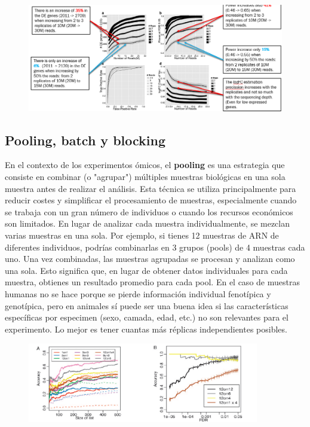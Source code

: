 \begin{figure}[h]
\centering
\includegraphics[width = \textwidth]{figs/replicates-depth.png}
\end{figure}

\subsection{Pooling, batch y blocking}
En el contexto de los experimentos ómicos, el \textbf{pooling} es una estrategia que consiste en combinar (o "agrupar") múltiples muestras biológicas en una sola muestra antes de realizar el análisis. Esta técnica se utiliza principalmente para reducir costes y simplificar el procesamiento de muestras, especialmente cuando se trabaja con un gran número de individuos o cuando los recursos económicos son limitados. En lugar de analizar cada muestra individualmente, se mezclan varias muestras en una sola. Por ejemplo, si tienes 12 muestras de ARN de diferentes individuos, podrías combinarlas en 3 grupos (pools) de 4 muestras cada uno. Una vez combinadas, las muestras agrupadas se procesan y analizan como una sola. Esto significa que, en lugar de obtener datos individuales para cada muestra, obtienes un resultado promedio para cada pool. En el caso de muestras humanas no se hace porque se pierde información individual fenotípica y genotípica, pero en animales sí puede ser una buena idea si las características específicas por especimen (sexo, camada, edad, etc.) no son relevantes para el experimento. Lo mejor es tener cuantas más réplicas independientes posibles. 

\begin{figure}[h]
\centering
\includegraphics[width = 0.9\textwidth]{figs/pooling.png}
\end{figure}

